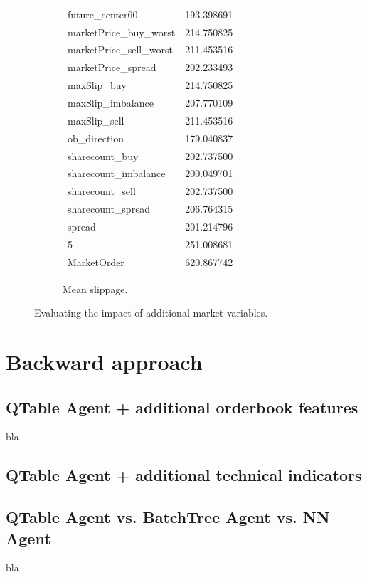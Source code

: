 \begin{figure}[ht]
\begin{subfigure}[b]{0.25\textwidth}
{\begin{tabular}{lr}
future\_center60        &  193.398691 \\
marketPrice\_buy\_worst  &  214.750825 \\
marketPrice\_sell\_worst &  211.453516 \\
marketPrice\_spread     &  202.233493 \\
maxSlip\_buy            &  214.750825 \\
maxSlip\_imbalance      &  207.770109 \\
maxSlip\_sell           &  211.453516 \\
ob\_direction           &  179.040837 \\
sharecount\_buy         &  202.737500 \\
sharecount\_imbalance   &  200.049701 \\
sharecount\_sell        &  202.737500 \\
sharecount\_spread      &  206.764315 \\
spread                 &  201.214796 \\
5                      &  251.008681 \\
MarketOrder            &  620.867742 \\
\bottomrule
\end{tabular}}        		 
        		\caption{Mean slippage.}
		\label{fig:eval:additionalMarketVariables:mean}
    	\end{subfigure}

	\caption{Evaluating the impact of additional market variables.}
	\label{fig:eval:additionalMarketVariables}
\end{figure}




\section{Backward approach}

\subsection{QTable Agent + additional orderbook features}
bla

\subsection{QTable Agent + additional technical indicators}

\subsection{QTable Agent vs. BatchTree Agent vs. NN Agent}
bla




